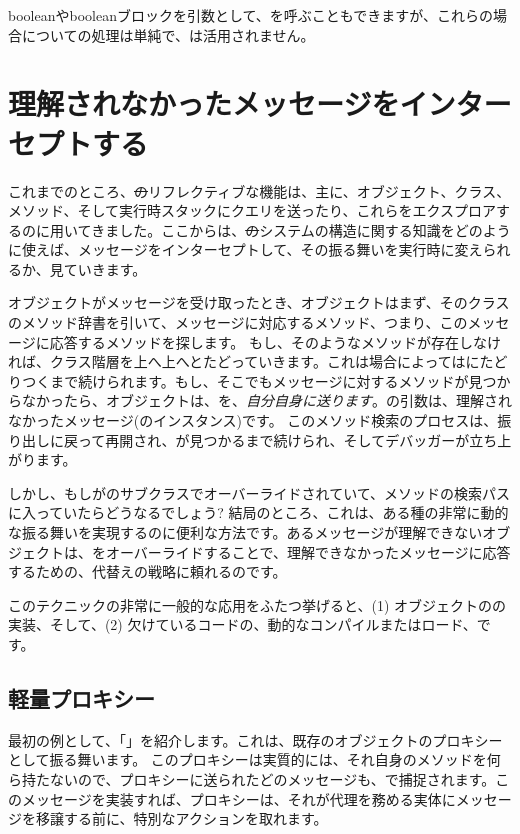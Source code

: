 \documentclass[a4paper,10pt,twoside]{book}
\begin{document}
booleanやbooleanブロックを引数として、を呼ぶこともできますが、これらの場合についての処理は単純で、は活用されません。

\section{理解されなかったメッセージをインターセプトする}

これまでのところ、\st のリフレクティブな機能は、主に、オブジェクト、クラス、メソッド、そして実行時スタックにクエリを送ったり、これらをエクスプロアするのに用いてきました。ここからは、\st のシステムの構造に関する知識をどのように使えば、メッセージをインターセプトして、その振る舞いを実行時に変えられるか、見ていきます。

オブジェクトがメッセージを受け取ったとき、オブジェクトはまず、そのクラスのメソッド辞書を引いて、メッセージに対応するメソッド、つまり、このメッセージに応答するメソッドを探します。
もし、そのようなメソッドが存在しなければ、クラス階層を上へ上へとたどっていきます。これは場合によってはにたどりつくまで続けられます。もし、そこでもメッセージに対するメソッドが見つからなかったら、オブジェクトは、を、\emph{自分自身に送ります}。の引数は、理解されなかったメッセージ(のインスタンス)です。
このメソッド検索のプロセスは、振り出しに戻って再開され、が見つかるまで続けられ、そしてデバッガーが立ち上がります。

しかし、もしがのサブクラスでオーバーライドされていて、メソッドの検索パスに入っていたらどうなるでしょう?
結局のところ、これは、ある種の非常に動的な振る舞いを実現するのに便利な方法です。あるメッセージが理解できないオブジェクトは、をオーバーライドすることで、理解できなかったメッセージに応答するための、代替えの戦略に頼れるのです。

このテクニックの非常に一般的な応用をふたつ挙げると、(1) オブジェクトのの実装、そして、(2) 欠けているコードの、動的なコンパイルまたはロード、です。

\subsection{軽量プロキシー}

最初の例として、「」を紹介します。これは、既存のオブジェクトのプロキシーとして振る舞います。
このプロキシーは実質的には、それ自身のメソッドを何ら持たないので、プロキシーに送られたどのメッセージも、で捕捉されます。このメッセージを実装すれば、プロキシーは、それが代理を務める実体にメッセージを移譲する前に、特別なアクションを取れます。
\end{document}
